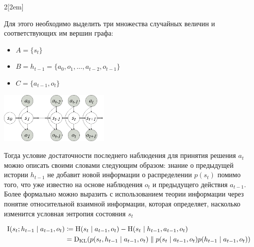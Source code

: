 \documentclass[../main.tex]{subfiles}
\begin{document}
\begin{multicols}{2}[\columnsep2em] 

	
	Для этого необходимо выделить три множества случайных величин и соответствующих им   вершин графа:
	\begin{itemize}
		\item $A=\{ s_t\}$ 
		\item $B=h_{t-1} = \{a_0, o_1,... , a_{t-2}, o_{t-1}\}$ 
		\item $C=\{ a_{t-1}, o_t \}$ 
	\end{itemize}
	\columnbreak
	\includegraphics[width=0.4\textwidth]{Images/HMM.png}
	
\end{multicols}


Тогда условие достаточности последнего наблюдения для принятия решения $a_t$  можно описать своими словами следующим образом:     знание о предыдущей истории $h_{t-1}$  не добавит новой информации о распределении $ p(s_t)$ помимо того, что уже известно на основе наблюдения  $o_t$ и предыдущего действия $a_{t-1}$.
Более формально можно выразить с использованием теории информации через понятие относительной взаимной информации, которая определяет, насколько  изменится условная энтропия  состояния $s_t$

\begin{align*} \label{mutualinfo}
\operatorname{I}(s_t;h_{t-1} \mid a_{t-1}, o_t) &\coloneqq \operatorname{H}(s_t \mid a_{t-1}, o_t) - \operatorname{H}(s_t \mid h_{t-1}, a_{t-1}, o_t)  \\
 &=\operatorname{D}_{\mathrm{KL}}(p(s_t, h_{t-1} \mid  a_{t-1}, o_t) \parallel p(s_t \mid  a_{t-1}, o_t)p( h_{t-1} \mid  a_{t-1}, o_t))
\end{align*}
\end{document}
